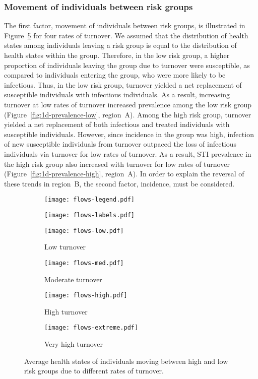\subsubsection{Movement of individuals between risk groups}
The first factor, movement of individuals between risk groups,
is illustrated in Figure~\ref{fig:flows} for four rates of turnover.
We assumed that the distribution of health states among individuals leaving a risk group
is equal to the distribution of health states within the group.
Therefore, in the low risk group,
a higher proportion of individuals leaving the group due to turnover were susceptible,
as compared to individuals entering the group, who were more likely to be infectious.
Thus, in the low risk group,
turnover yielded a net replacement of susceptible individuals with infectious individuals.
As a result, increasing turnover at low rates of turnover
increased prevalence among the low risk group
(Figure~\ref{fig:1d-prevalence-low}, region~A).
Among the high risk group,
turnover yielded a net replacement of both infectious and treated individuals
with susceptible individuals.
However, since incidence in the group was high,
infection of new susceptible individuals from turnover
outpaced the loss of infectious individuals via turnover
for low rates of turnover.
As a result, STI prevalence in the high risk group
also increased with turnover for low rates of turnover
(Figure~\ref{fig:1d-prevalence-high}, region~A).
In order to explain the reversal of these trends in region~B,
the second factor, incidence, must be considered.
\par
\begin{figure}[!tbp]
  \centering
  \begin{subfigure}[t]{0.6\linewidth}
    \centering
    \texttt{[image: flows-legend.pdf]}
  \end{subfigure}
  \begin{subfigure}[t]{0.15\linewidth}
    \centering
    \texttt{[image: flows-labels.pdf]}
  \end{subfigure}%
  \begin{subfigure}[t]{0.2\linewidth}
    \centering
    \texttt{[image: flows-low.pdf]}
    \caption{Low turnover}
    \label{fig:flows-low}
  \end{subfigure}%
  \begin{subfigure}[t]{0.2\linewidth}
    \centering
    \texttt{[image: flows-med.pdf]}
    \caption{Moderate turnover}
    \label{fig:flows-med}
  \end{subfigure}%
  \begin{subfigure}[t]{0.2\linewidth}
    \centering
    \texttt{[image: flows-high.pdf]}
    \caption{High turnover}
    \label{fig:flows-high}
  \end{subfigure}%
  \begin{subfigure}[t]{0.2\linewidth}
    \centering
    \texttt{[image: flows-extreme.pdf]}
    \caption{Very high turnover}
    \label{fig:flows-extreme}
  \end{subfigure}
  \caption{Average health states of individuals
    moving between high and low risk groups due to different rates of turnover.}
  \label{fig:flows}
\end{figure}
